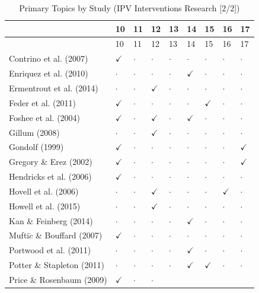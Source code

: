 \documentclass[11pt,]{tufte-book}
\begin{document}
\begin{no-prefix-table-caption}

\begin{longtable}[]{@{}lllllllll@{}}
\caption{Primary Topics by Study (IPV Interventions Research
{[}2/2{]})}\tabularnewline
\toprule
& 10 & 11 & 12 & 13 & 14 & 15 & 16 & 17\tabularnewline
\midrule
\endfirsthead
\toprule
& 10 & 11 & 12 & 13 & 14 & 15 & 16 & 17\tabularnewline
\midrule
\endhead
Contrino et al. (2007) & \(\checkmark\) & \(\cdot\) & \(\cdot\) &
\(\cdot\) & \(\cdot\) & \(\cdot\) & \(\cdot\) & \(\cdot\)\tabularnewline
Enriquez et al. (2010) & \(\cdot\) & \(\cdot\) & \(\cdot\) & \(\cdot\) &
\(\checkmark\) & \(\cdot\) & \(\cdot\) & \(\cdot\)\tabularnewline
Ermentrout et al. (2014) & \(\cdot\) & \(\cdot\) & \(\checkmark\) &
\(\cdot\) & \(\cdot\) & \(\cdot\) & \(\cdot\) & \(\cdot\)\tabularnewline
Feder et al. (2011) & \(\checkmark\) & \(\cdot\) & \(\cdot\) & \(\cdot\)
& \(\cdot\) & \(\checkmark\) & \(\cdot\) & \(\cdot\)\tabularnewline
Foshee et al. (2004) & \(\checkmark\) & \(\cdot\) & \(\checkmark\) &
\(\cdot\) & \(\checkmark\) & \(\cdot\) & \(\cdot\) &
\(\cdot\)\tabularnewline
Gillum (2008) & \(\cdot\) & \(\cdot\) & \(\checkmark\) & \(\cdot\) &
\(\cdot\) & \(\cdot\) & \(\cdot\) & \(\cdot\)\tabularnewline
Gondolf (1999) & \(\checkmark\) & \(\cdot\) & \(\cdot\) & \(\cdot\) &
\(\cdot\) & \(\cdot\) & \(\cdot\) & \(\checkmark\)\tabularnewline
Gregory \& Erez (2002) & \(\checkmark\) & \(\cdot\) & \(\cdot\) &
\(\cdot\) & \(\cdot\) & \(\cdot\) & \(\cdot\) &
\(\checkmark\)\tabularnewline
Hendricks et al. (2006) & \(\checkmark\) & \(\cdot\) & \(\cdot\) &
\(\cdot\) & \(\cdot\) & \(\cdot\) & \(\cdot\) & \(\cdot\)\tabularnewline
Hovell et al. (2006) & \(\cdot\) & \(\cdot\) & \(\checkmark\) &
\(\cdot\) & \(\cdot\) & \(\cdot\) & \(\checkmark\) &
\(\cdot\)\tabularnewline
Howell et al. (2015) & \(\cdot\) & \(\cdot\) & \(\checkmark\) &
\(\cdot\) & \(\cdot\) & \(\cdot\) & \(\cdot\) & \(\cdot\)\tabularnewline
Kan \& Feinberg (2014) & \(\cdot\) & \(\cdot\) & \(\cdot\) & \(\cdot\) &
\(\checkmark\) & \(\cdot\) & \(\cdot\) & \(\cdot\)\tabularnewline
Mufti\(\acute{c}\) \& Bouffard (2007) & \(\checkmark\) & \(\cdot\) &
\(\cdot\) & \(\cdot\) & \(\cdot\) & \(\cdot\) & \(\cdot\) &
\(\cdot\)\tabularnewline
Portwood et al. (2011) & \(\cdot\) & \(\cdot\) & \(\cdot\) & \(\cdot\) &
\(\checkmark\) & \(\cdot\) & \(\cdot\) & \(\cdot\)\tabularnewline
Potter \& Stapleton (2011) & \(\cdot\) & \(\cdot\) & \(\cdot\) &
\(\cdot\) & \(\checkmark\) & \(\checkmark\) & \(\cdot\) &
\(\cdot\)\tabularnewline
Price \& Rosenbaum (2009) & \(\checkmark\) & \(\cdot\) & \(\cdot\) &

\end{longtable}
\end{no-prefix-table-caption}
\end{document}
